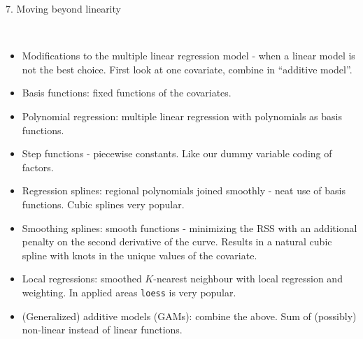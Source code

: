 \documentclass[10pt,ignorenonframetext,]{beamer}
\begin{document}
\begin{frame}

\begin{block}{7. Moving beyond linearity}

\(~\)

\begin{itemize}
\item
  Modifications to the multiple linear regression model - when a linear
  model is not the best choice. First look at one covariate, combine in
  ``additive model''. \vspace{2mm}
\item
  Basis functions: fixed functions of the covariates. \vspace{2mm}
\item
  Polynomial regression: multiple linear regression with polynomials as
  basis functions. \vspace{2mm}
\item
  Step functions - piecewise constants. Like our dummy variable coding
  of factors. \vspace{2mm}
\item
  Regression splines: regional polynomials joined smoothly - neat use of
  basis functions. Cubic splines very popular.
\end{itemize}

\end{block}

\end{frame}

\begin{frame}[fragile]

\begin{itemize}
\item
  Smoothing splines: smooth functions - minimizing the RSS with an
  additional penalty on the second derivative of the curve. Results in a
  natural cubic spline with knots in the unique values of the covariate.
  \vspace{2mm}
\item
  Local regressions: smoothed \(K\)-nearest neighbour with local
  regression and weighting. In applied areas \texttt{loess} is very
  popular. \vspace{2mm}
\item
  (Generalized) additive models (GAMs): combine the above. Sum of
  (possibly) non-linear instead of linear functions.
\end{itemize}

\end{frame}
\end{document}
